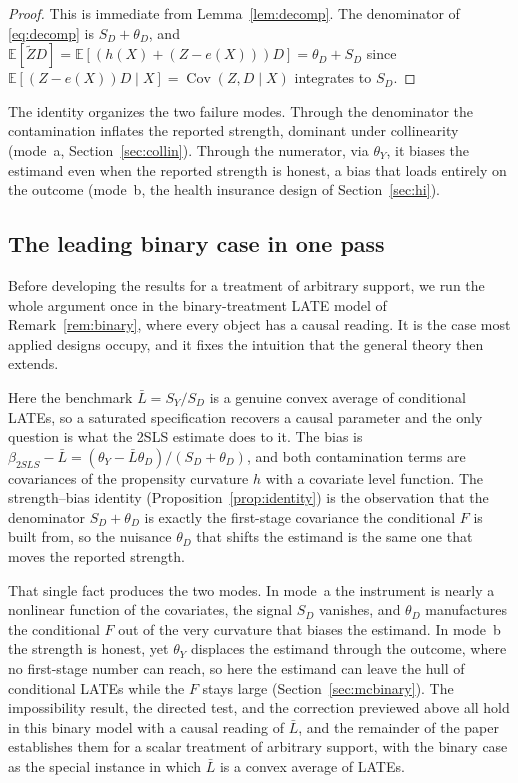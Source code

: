 \documentclass[preprint,11pt,authoryear]{elsarticle}
\theoremstyle{definition}
\newcommand{\E}{\mathbb{E}}
\newcommand{\Cov}{\operatorname{Cov}}
\newcommand{\Ztil}{\tilde{Z}}
\begin{document}
\begin{proof}
This is immediate from Lemma~\ref{lem:decomp}. The denominator of \eqref{eq:decomp} is
$S_D+\theta_D$, and $\E[\Ztil D]=\E[(h(X)+(Z-e(X)))D]=\theta_D+S_D$ since
$\E[(Z-e(X))D\mid X]=\Cov(Z,D\mid X)$ integrates to $S_D$.
\end{proof}

\noindent The identity organizes the two failure modes. Through the
denominator the contamination inflates the reported strength, dominant under
collinearity (mode~a, Section~\ref{sec:collin}). Through the numerator, via
$\theta_Y$, it biases the estimand even when the reported strength is honest, a bias
that loads entirely on the outcome (mode~b, the health insurance design of
Section~\ref{sec:hi}).

\subsection*{The leading binary case in one pass}
Before developing the results for a treatment of arbitrary support, we run the whole
argument once in the binary-treatment LATE model of Remark~\ref{rem:binary}, where every
object has a causal reading. It is the case most applied designs occupy, and it fixes the
intuition that the general theory then extends.

Here the benchmark $\bar L=S_Y/S_D$ is a genuine convex average of conditional
LATEs, so a saturated specification recovers a causal parameter and the only question is
what the 2SLS estimate does to it. The bias is
$\beta_{2SLS}-\bar L=(\theta_Y-\bar L\theta_D)/(S_D+\theta_D)$, and both contamination
terms are covariances of the propensity curvature $h$ with a covariate level function.
The strength--bias identity (Proposition~\ref{prop:identity}) is the observation that the
denominator $S_D+\theta_D$ is exactly the first-stage covariance the conditional $F$ is
built from, so the nuisance $\theta_D$ that shifts the estimand is the same one that moves
the reported strength.

That single fact produces the two modes. In mode~a the instrument is nearly a nonlinear
function of the covariates, the signal $S_D$ vanishes, and $\theta_D$ manufactures the
conditional $F$ out of the very curvature that biases the estimand. In mode~b the strength
is honest, yet $\theta_Y$ displaces the estimand through the outcome, where no first-stage
number can reach, so here the estimand can leave the hull of conditional LATEs while the
$F$ stays large (Section~\ref{sec:mcbinary}). The impossibility result, the directed test,
and the correction previewed above all hold in this binary model with a causal reading of
$\bar L$, and the remainder of the paper establishes them for a scalar treatment of
arbitrary support, with the binary case as the special instance in which $\bar L$ is a
convex average of LATEs.
\end{document}
